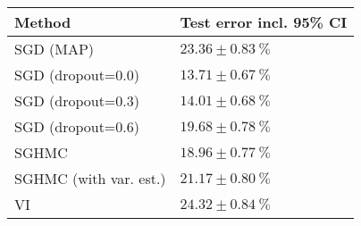 \begin{tabular}{ll}
\toprule
                Method & Test error incl. 95\% CI \\
\midrule
             SGD (MAP) &      $23.36 \pm 0.83~\%$ \\
     SGD (dropout=0.0) &      $13.71 \pm 0.67~\%$ \\
     SGD (dropout=0.3) &      $14.01 \pm 0.68~\%$ \\
     SGD (dropout=0.6) &      $19.68 \pm 0.78~\%$ \\
                 SGHMC &      $18.96 \pm 0.77~\%$ \\
SGHMC (with var. est.) &      $21.17 \pm 0.80~\%$ \\
                    VI &      $24.32 \pm 0.84~\%$ \\
\bottomrule
\end{tabular}
